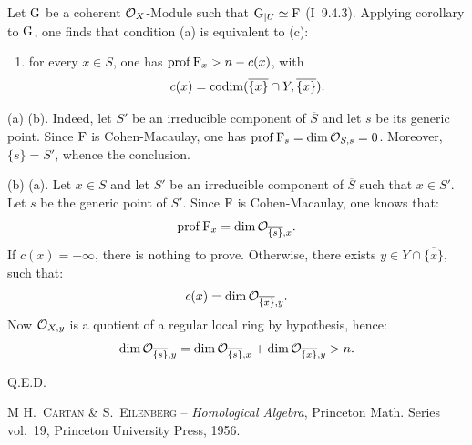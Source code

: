 Let ${\operatorname{G}}$ be a coherent $\mathcal{O}_X$-Module such that ${\operatorname{G}}{}_{|U}\simeq {\operatorname{F}}$ (\EGA I~9.4.3). Applying corollary  to ${\operatorname{G}}$, one finds that condition (a) is equivalent to (c):
\begin{enumerate}
\item[(c)]
for every $x\in S$, one has $\operatorname{prof} {\operatorname{F}}_x>n-c(x)$, with
\[c(x)=\operatorname{codim}(\overline{\{x\}}\cap Y, \overline{\{x\}}).
\]
\end{enumerate}

(a) \ALORS (b). Indeed, let $S'$ be an irreducible component of $\overline S$ and let $s$ be its generic point. Since ${\operatorname{F}}$ is Cohen-Macaulay, one has $\operatorname{prof} {\operatorname{F}}_s=\dim {\mathcal O}_{S, s}=0$. Moreover, $\overline{\{s\}}=S'$, whence the conclusion.

(b) \ALORS (a). Let $x\in S$ and let $S'$ be an irreducible component of $\overline{S}$ such that $x\in S'$. Let $s$ be the generic point of $S'$. Since ${\operatorname{F}}$ is Cohen-Macaulay, one knows that:
\[
\operatorname{prof} {\operatorname{F}}_x=\dim {\mathcal O}_{\overline{\{s\}}, x}.
\]
If $c(x)=+\infty$, there is nothing to prove. Otherwise, there exists $y\in Y\cap \overline{\{x\}}$, such that:
\[c(x)=\dim {\mathcal O}_{\overline{\{x\}}, y}.
\]
Now ${\mathcal O}_{X, y}$ is a quotient of a regular local ring by hypothesis, hence:
\[
\dim {\mathcal O}_{\overline{\{s\}}, y}=\dim {\mathcal O}_{\overline{\{s\}}, x} +\dim {\mathcal O}_{\overline{\{x\}}, y}>n.
\]
\begin{flushright}Q.E.D.\end{flushright}

\begin{thebibliography}{M}
\textsc{H.~Cartan \& S.~Eilenberg} -- \emph{Homological Algebra}, Princeton Math. Series vol.~19, Princeton University Press, 1956.
\end{thebibliography}
